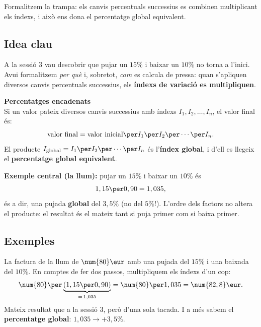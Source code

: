 %
{Formalitzem la trampa: els canvis percentuals successius es combinen multiplicant els índexs, i això ens dona el percentatge global equivalent.}

\subsection{Idea clau}

A la sessió 3 vau descobrir que pujar un $15\%$ i baixar un $10\%$ no torna a l'inici.
Avui formalitzem \emph{per què} i, sobretot, \emph{com} es calcula de pressa: quan
s'apliquen diversos canvis percentuals successius, els \textbf{índexs de variació es
multipliquen}.

\begin{idea}
\textbf{Percentatges encadenats}\\
Si un valor pateix diversos canvis successius amb índexs $I_1, I_2, \dots, I_n$, el
valor final és:
\[
\text{valor final}=\text{valor inicial}\per I_1\per I_2\per\cdots\per I_n.
\]
El producte $I_{\text{global}}=I_1\per I_2\per\cdots\per I_n$ és l'\textbf{índex
global}, i d'ell es llegeix el \textbf{percentatge global equivalent}.
\smallskip

\textbf{Exemple central (la llum):} pujar un $15\%$ i baixar un $10\%$ és
\[
1,15\per 0,90=1,035,
\]
és a dir, una pujada \textbf{global} del $3,5\%$ (no del $5\%$!). L'ordre dels factors
no altera el producte: el resultat és el mateix tant si puja primer com si baixa
primer.
\end{idea}

\subsection{Exemples}

\begin{exemple}
La factura de la llum de $\num{80}\eur$ amb una pujada del $15\%$ i una baixada del
$10\%$. En comptes de fer dos passos, multipliquem els índexs d'un cop:
\[
\num{80}\per\underbrace{(1,15\per 0,90)}_{=\,1,035}=\num{80}\per 1,035=\num{82,8}\eur.
\]
Mateix resultat que a la sessió 3, però d'una sola tacada. I a més sabem el
\textbf{percentatge global}: $1,035\rightarrow +3,5\%$.
\end{exemple}

